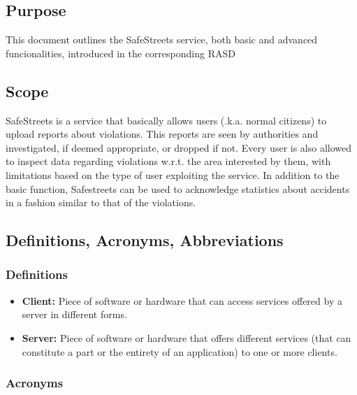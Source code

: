 \subsection{Purpose}

This document outlines the SafeStreets service, both basic and advanced funcionalities, introduced in the corresponding RASD

\subsection{Scope}

SafeStreets is a service that basically allows users (\a.k.a. normal citizens) to upload reports about violations. This reports are seen by authorities and investigated, if deemed appropriate, or dropped if not. Every user is also allowed to inspect data regarding violations w.r.t. the area interested by them, with limitations based on the type of user exploiting the service.
In addition to the basic function, Safestreets can be used to acknowledge statistics about accidents in a fashion similar to that of the violations.

\subsection{Definitions, Acronyms, Abbreviations}

\subsubsection{Definitions}

\begin{itemize}

\item \textbf{Client:}  Piece of software or hardware that can access services offered by a server in different forms.

\item \textbf{Server:} Piece of software or hardware that offers different services (that can constitute a part or the entirety of an application) to one or more clients.


\end{itemize}

\subsubsection{Acronyms}

